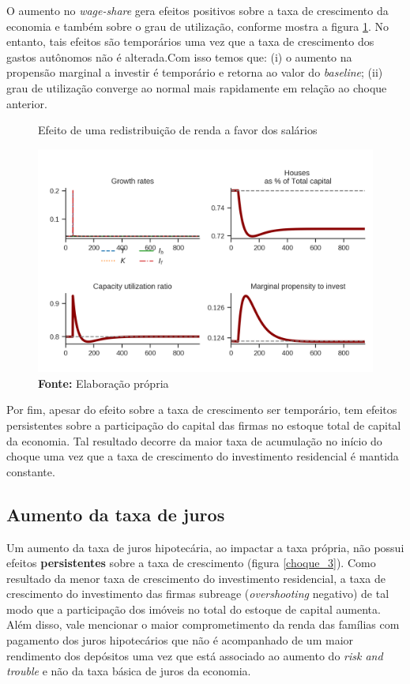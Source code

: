 O aumento no \textit{wage-share} gera efeitos positivos sobre a taxa de crescimento da economia e também sobre o grau de utilização, conforme mostra a figura \ref{choque_2}. No entanto, tais efeitos são temporários uma vez que a taxa de crescimento dos gastos autônomos não é alterada.Com isso temos que: (i) o aumento na propensão marginal a investir é temporário e retorna ao valor do \textit{baseline}; (ii) grau de utilização converge ao normal mais rapidamente em relação ao choque anterior. 


\begin{figure}[H]
	\centering
	\caption{Efeito de uma redistribuição de renda a favor dos salários}
	\label{choque_2}
	\includegraphics{../../Modelo/Versoes/Shock_2.png}
	\caption*{\textbf{Fonte:} Elaboração própria}
\end{figure}

Por fim, apesar do efeito sobre a taxa de crescimento ser temporário, tem efeitos persistentes sobre a participação do capital das firmas no estoque total de capital da economia. Tal resultado decorre da maior taxa de acumulação no início do choque uma vez que a taxa de crescimento do investimento residencial é mantida constante. 

\subsection*{Aumento da taxa de juros}

Um aumento da taxa de juros hipotecária, ao impactar a taxa própria, não possui efeitos \textbf{persistentes} sobre a taxa de crescimento (figura \ref{choque_3}). Como resultado da menor taxa de crescimento do investimento residencial, a taxa de crescimento do investimento das firmas subreage (\textit{overshooting} negativo) de tal modo que a participação dos imóveis no total do estoque de capital aumenta. Além disso, vale mencionar o maior comprometimento da renda das famílias com pagamento dos juros hipotecários que não é acompanhado de um maior rendimento dos depósitos uma vez que está associado ao aumento do \textit{risk and trouble} e não da taxa básica de juros da economia.

